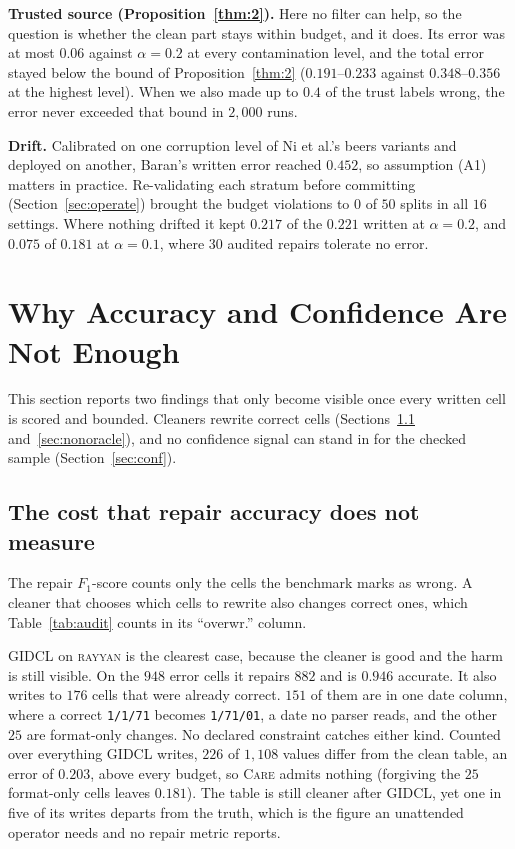 \documentclass[sigconf, nonacm, balance=false]{acmart}
\theoremstyle{remark}
\begin{document}
\textbf{Trusted source (Proposition~\ref{thm:2}).} Here no filter can help, so the
question is whether the clean part stays within budget, and it does. Its error was at
most $0.06$ against $\alpha=0.2$ at every contamination level, and the total error
stayed below the bound of Proposition~\ref{thm:2} ($0.191$--$0.233$ against
$0.348$--$0.356$ at the highest level). When we also made up to $0.4$ of the trust
labels wrong, the error never exceeded that bound in $2{,}000$ runs.

\textbf{Drift.} Calibrated on one corruption level of Ni et al.'s beers variants and
deployed on another, Baran's written error reached $0.452$, so assumption (A1) matters
in practice. Re-validating each stratum before committing
(Section~\ref{sec:operate}) brought the budget violations to $0$ of $50$ splits in all
$16$ settings. Where nothing drifted it kept $0.217$ of the $0.221$ written at
$\alpha=0.2$, and $0.075$ of $0.181$ at $\alpha=0.1$, where $30$ audited repairs
tolerate no error.

\section{Why Accuracy and Confidence Are Not Enough}
\label{sec:findings}

This section reports two findings that only become visible once every written
cell is scored and bounded. Cleaners rewrite correct cells
(Sections~\ref{sec:harm} and~\ref{sec:nonoracle}), and no confidence signal can stand in
for the checked sample (Section~\ref{sec:conf}).

\subsection{The cost that repair accuracy does not measure}
\label{sec:harm}

The repair $F_1$-score counts only the cells the benchmark marks as wrong. A cleaner
that chooses which cells to rewrite also changes correct ones, which
Table~\ref{tab:audit} counts in its ``overwr.'' column.

GIDCL on \textsc{rayyan} is the clearest case, because the cleaner is good and the harm
is still visible. On the $948$ error cells it repairs $882$ and is $0.946$ accurate. It
also writes to $176$ cells that were already correct. $151$ of them are in one date
column, where a correct \texttt{1/1/71} becomes \texttt{1/71/01}, a date no parser
reads, and the other $25$ are format-only changes. No declared constraint catches
either kind. Counted over everything GIDCL writes, $226$ of $1{,}108$ values differ from
the clean table, an error of $0.203$, above every budget, so \textsc{Care} admits
nothing (forgiving the $25$ format-only cells leaves $0.181$). The table is still
cleaner after GIDCL, yet one in five of its writes departs from the truth, which is the
figure an unattended operator needs and no repair metric reports.
\end{document}
